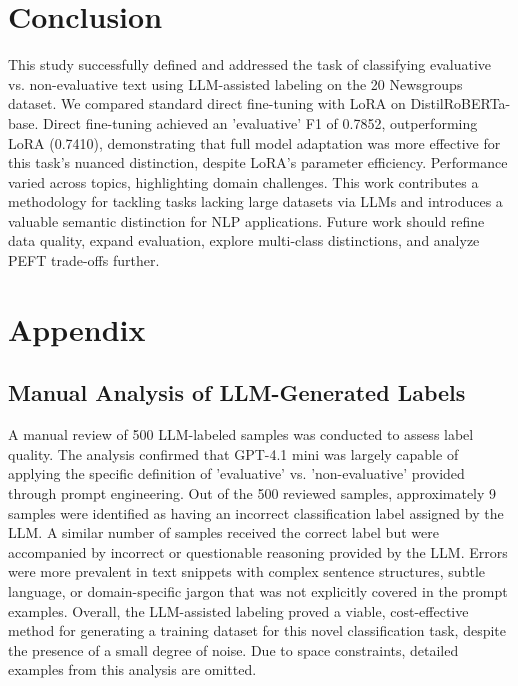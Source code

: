 \documentclass{article}
\begin{document}
\section{Conclusion}
\label{sec:conclusion}
This study successfully defined and addressed the task of classifying evaluative vs. non-evaluative text using LLM-assisted labeling on the 20 Newsgroups dataset. We compared standard direct fine-tuning with LoRA on DistilRoBERTa-base. Direct fine-tuning achieved an 'evaluative' F1 of 0.7852, outperforming LoRA (0.7410), demonstrating that full model adaptation was more effective for this task's nuanced distinction, despite LoRA's parameter efficiency. Performance varied across topics, highlighting domain challenges. This work contributes a methodology for tackling tasks lacking large datasets via LLMs and introduces a valuable semantic distinction for NLP applications. Future work should refine data quality, expand evaluation, explore multi-class distinctions, and analyze PEFT trade-offs further.

\section{Appendix}
\label{sec:appendix}

\subsection{Manual Analysis of LLM-Generated Labels}
\label{sec:appendix:manual_analysis}
A manual review of 500 LLM-labeled samples was conducted to assess label quality. The analysis confirmed that GPT-4.1 mini was largely capable of applying the specific definition of 'evaluative' vs. 'non-evaluative' provided through prompt engineering. Out of the 500 reviewed samples, approximately 9 samples were identified as having an incorrect classification label assigned by the LLM. A similar number of samples received the correct label but were accompanied by incorrect or questionable reasoning provided by the LLM. Errors were more prevalent in text snippets with complex sentence structures, subtle language, or domain-specific jargon that was not explicitly covered in the prompt examples. Overall, the LLM-assisted labeling proved a viable, cost-effective method for generating a training dataset for this novel classification task, despite the presence of a small degree of noise. Due to space constraints, detailed examples from this analysis are omitted.


\medskip

\end{document}
